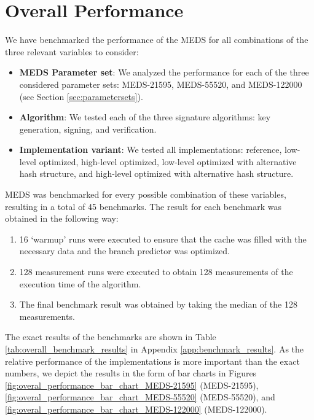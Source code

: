 \documentclass[11pt,a4paper]{report}
\theoremstyle{definition}
\begin{document}
\section{Overall Performance}
\label{sec:overallperformance}
We have benchmarked the performance of the MEDS for all combinations of the three relevant variables to consider:
\begin{itemize}
  \item \textbf{MEDS Parameter set}: We analyzed the performance for each of the three considered parameter sets: MEDS-21595, MEDS-55520, and MEDS-122000 (see Section \ref{sec:parametersets}).
  \item \textbf{Algorithm}: We tested each of the three signature algorithms: key generation, signing, and verification.
  \item \textbf{Implementation variant}: We tested all implementations: reference, low-level optimized, high-level optimized, low-level optimized with alternative hash structure, and high-level optimized with alternative hash structure.
\end{itemize}
MEDS was benchmarked for every possible combination of these variables, resulting in a total of 45 benchmarks. The result for each benchmark was obtained in the following way:
\begin{enumerate}
  \item 16 `warmup' runs were executed to ensure that the cache was filled with the necessary data and the branch predictor was optimized.
  \item 128 measurement runs were executed to obtain 128 measurements of the execution time of the algorithm.
  \item The final benchmark result was obtained by taking the median of the 128 measurements.
\end{enumerate}

The exact results of the benchmarks are shown in Table \ref{tab:overall_benchmark_results} in Appendix \ref{app:benchmark_results}. As the relative performance of the implementations is more important than the exact numbers, we depict the results in the form of bar charts in Figures \ref{fig:overal_performance_bar_chart_MEDS-21595} (MEDS-21595), \ref{fig:overal_performance_bar_chart_MEDS-55520} (MEDS-55520), and \ref{fig:overal_performance_bar_chart_MEDS-122000} (MEDS-122000).
\end{document}
